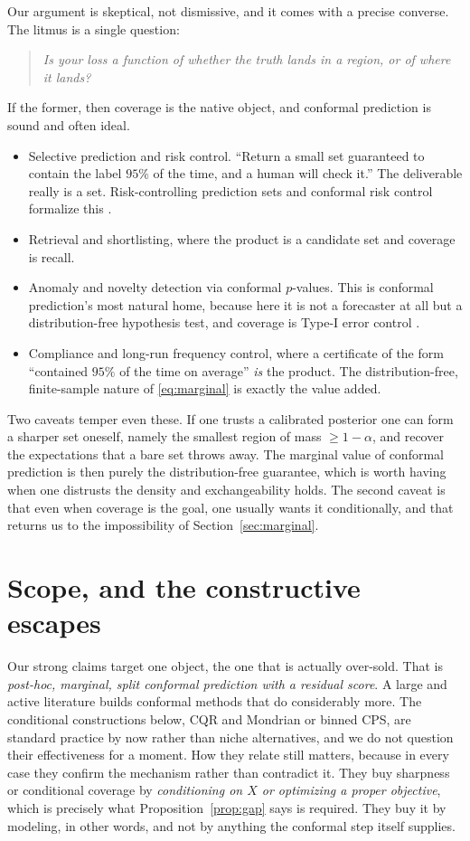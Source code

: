 \documentclass[11pt]{article}
\theoremstyle{definition}
\begin{document}
Our argument is skeptical, not dismissive, and it comes with a precise converse. The litmus
is a single question:
\begin{quote}
\emph{Is your loss a function of \emph{whether} the truth lands in a region, or of
\emph{where} it lands?}
\end{quote}
If the former, then coverage is the native object, and conformal prediction is sound and
often ideal.
\begin{itemize}
  \item Selective prediction and risk control. ``Return a small set guaranteed to contain
  the label $95\%$ of the time, and a human will check it.'' The deliverable really is a
  set. Risk-controlling prediction sets and conformal risk control formalize this
  \citep{angelopoulos2021uncertainty, bates2021distribution, angelopoulos2024conformalrisk}.
  \item Retrieval and shortlisting, where the product is a candidate set and coverage is
  recall.
  \item Anomaly and novelty detection via conformal $p$-values. This is conformal
  prediction's most natural home, because here it is not a forecaster at all but a
  distribution-free hypothesis test, and coverage is Type-I error control
  \citep{vovk2005algorithmic}.
  \item Compliance and long-run frequency control, where a certificate of the form
  ``contained $95\%$ of the time on average'' \emph{is} the product. The distribution-free,
  finite-sample nature of \eqref{eq:marginal} is exactly the value added.
\end{itemize}
Two caveats temper even these. If one trusts a calibrated posterior one can form a sharper
set oneself, namely the smallest region of mass $\ge 1-\alpha$, and recover the expectations
that a bare set throws away. The marginal value of conformal prediction is then purely the
distribution-free guarantee, which is worth having when one distrusts the density and
exchangeability holds. The second caveat is that even when coverage is the goal, one usually
wants it conditionally, and that returns us to the impossibility of
Section~\ref{sec:marginal}.

\section{Scope, and the constructive escapes}\label{sec:scope}

Our strong claims target one object, the one that is actually over-sold. That is
\emph{post-hoc, marginal, split conformal prediction with a residual score}. A large and
active literature builds conformal methods that do considerably more. The conditional
constructions below, CQR and Mondrian or binned CPS, are standard practice by now rather
than niche alternatives, and we do not question their effectiveness for a moment. How they
relate still matters, because in every case they confirm the mechanism rather than
contradict it. They buy sharpness or conditional coverage by \emph{conditioning on $X$ or
optimizing a proper objective}, which is precisely what Proposition~\ref{prop:gap} says is
required. They buy it by modeling, in other words, and not by anything the conformal step
itself supplies.
\end{document}
